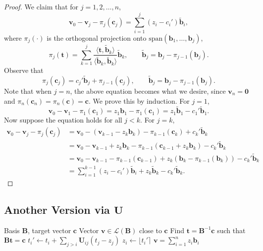 \begin{proof}
	We claim that for $j = 1, 2, \dots, n$,
	\[
		\mathbf{v}_0 - \mathbf{v}_j - \pi_j(\mathbf{c}_j) = \sum_{i=1}^j (z_i - c_i') \mathbf{\tilde b}_i,
	\]
	where $\pi_j(\cdot)$ is the orthogonal projection onto $\mathrm{span}(\mathbf{b}_1, \dots, \mathbf{b}_j)$,
	\[
		\pi_j(\mathbf{t}) = \sum_{k=1}^j \frac{\langle \mathbf{t}, \mathbf{\tilde b}_k \rangle}{\langle \mathbf{\tilde b}_k, \mathbf{\tilde b}_k \rangle} \mathbf{\tilde b}_k, \qquad \mathbf{\tilde b}_j = \mathbf{b}_j - \pi_{j-1}(\mathbf{b}_j).
	\]
	Observe that
	\[
		\pi_j(\mathbf{c}_j) = c_j' \mathbf{\tilde b}_j + \pi_{j-1}(\mathbf{c}_j), \qquad \mathbf{\tilde b}_j = \mathbf{b}_j - \pi_{j-1}(\mathbf{b}_j).
	\]
	Note that when $j = n$, the above equation becomes what we desire, since $\mathbf{v}_n = \mathbf{0}$ and $\pi_n(\mathbf{c}_n) = \pi_n(\mathbf{c}) = \mathbf{c}$.
	We prove this by induction. For $j = 1$,
	\[
		\mathbf{v}_0 - \mathbf{v}_1 - \pi_1(\mathbf{c}_1) = z_1 \mathbf{b}_1 - \pi_1(\mathbf{c}_1) = z_1 \mathbf{\tilde b}_1 - c_1' \mathbf{\tilde b}_1.
	\]
	Now suppose the equation holds for all $j < k$. For $j = k$,
	\begin{align*}
		\mathbf{v}_0 - \mathbf{v}_j - \pi_j(\mathbf{c}_j)
		&= \mathbf{v}_0 - (\mathbf{v}_{k-1} - z_k \mathbf{b}_k) - \pi_{k-1}(\mathbf{c}_k) + c_k' \mathbf{\tilde b}_k \\
		&= \mathbf{v}_0 - \mathbf{v}_{k-1} + z_k \mathbf{b}_k - \pi_{k-1}(\mathbf{c}_{k-1} + z_k \mathbf{b}_k) - c_k' \mathbf{\tilde b}_k \\
		&= \mathbf{v}_0 - \mathbf{v}_{k-1} - \pi_{k-1}(\mathbf{c}_{k-1}) + z_k (\mathbf{b}_k - \pi_{k-1}(\mathbf{b}_k)) - c_k' \mathbf{\tilde b}_k \\
		&= \sum_{i=1}^{k-1} (z_i - c_i') \mathbf{\tilde b}_i + z_k \mathbf{\tilde b}_k - c_k' \mathbf{\tilde b}_k.
	\end{align*}
\end{proof}

\subsection{Another Version via \texorpdfstring{$\mathbf{U}$}{U}}

\begin{algorithm}[H]
	\caption{Nearest-Plane Algorithm (via $\mathbf{U}$)}
	\label{alg:nearest-plane-u}
	\begin{algorithmic}[1]
		\Require Basis $\mathbf{B}$, target vector $\mathbf{c}$
		\Ensure Vector $\mathbf{v} \in \mathcal{L}(\mathbf{B})$ close to $\mathbf{c}$
		\State Find $\mathbf{t} = \mathbf{B}^{-1}\mathbf{c}$ such that $\mathbf{B}\mathbf{t} = \mathbf{c}$
			\State $t_i' \gets t_i + \sum_{j > i} \mathbf{U}_{ij} (t_j - z_j)$
			\State $z_i \gets \lfloor t_i' \rceil$
		\EndFor
		\State \Return $\mathbf{v} = \sum_{i=1}^n z_i \mathbf{b}_i$
	\end{algorithmic}
\end{algorithm}

